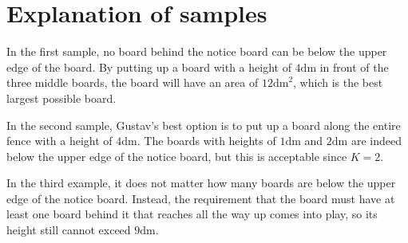 \section*{Explanation of samples}
In the first sample, no board behind the notice board can be below the upper edge of the board.
By putting up a board with a height of $4 \text{dm}$ in front of the three middle boards, the board
will have an area of $12 \text{dm}^2$, which is the best largest possible board.

In the second sample, Gustav's best option is to put up a board along the entire fence with a height
of $4 \text{dm}$. The boards with heights of $1 \text{dm}$ and $2 \text{dm}$ are indeed below the
upper edge of the notice board, but this is acceptable since $K = 2$.

In the third example, it does not matter how many boards are below the upper edge of the notice board.
Instead, the requirement that the board must have at least one board behind it that reaches all the way
up comes into play, so its height still cannot exceed $9 \text{dm}$.